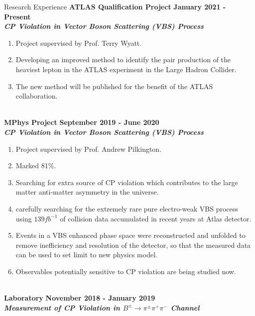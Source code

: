 \documentclass{resume} %
\begin{document}
    \begin{rSection}{Research Experience}
        {\bf ATLAS Qualification Project} \hfill {\bf January 2021 - Present}\\
        {\bf \em CP Violation in Vector Boson Scattering (VBS) Process}
        \begin{enumerate}[leftmargin=*,label=$\bullet$]
            \item   Project supervised by Prof. Terry Wyatt.
            \item   Developing an improved method to identify the pair production of the heaviest lepton in the ATLAS experiment in the Large Hadron Collider.
            \item   The new method will be published for the benefit of the ATLAS collaboration.
        \end{enumerate}
        \ \\[0pt]
        {\bf MPhys Project} \hfill {\bf September 2019 - June 2020}\\
        {\bf \em CP Violation in Vector Boson Scattering (VBS) Process}
        \begin{enumerate}[leftmargin=*,label=$\bullet$]
            \item   Project supervised by Prof. Andrew Pilkington.
            \item   Marked 81\%.
            \item   Searching for extra source of CP violation which contributes to the large matter anti-matter asymmetry 
                    in the universe.
            \item   carefully searching for the extremely rare pure electro-weak VBS process using $139 fb^{-1}$ 
                    of collision data accumulated in recent years at Atlas detector.
            \item   Events in a VBS enhanced phase space were reconstructed and unfolded to remove inefficiency and resolution of the detector, 
                    so that the measured data can be used to set limit to new physics model.
            \item   Observables potentially sensitive to CP violation are being studied now.
        \end{enumerate}
        \ \\[0pt]
        {\bf  Laboratory} \hfill {\bf November 2018 - January 2019}\\
        {\bf \em Measurement of CP Violation in $B^{\pm}\rightarrow\pi^{\pm}\pi^{+}\pi^{-}$ Channel}
        \begin{enumerate}[leftmargin=*,label=$\bullet$]

\end{enumerate}
\end{rSection}
\end{document}
